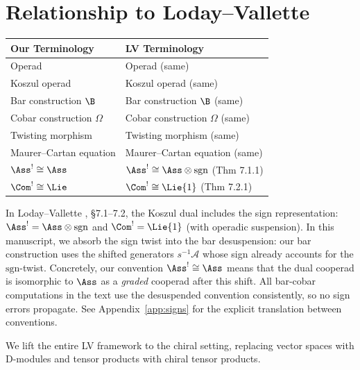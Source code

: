\section{Relationship to Loday--Vallette}

\begin{tabular}{>{\raggedright\arraybackslash}p{}>{\raggedright\arraybackslash}p{}}
\textbf{Our Terminology} & \textbf{LV Terminology} \\
\hline
Operad & Operad (same) \\
Koszul operad & Koszul operad (same) \\
Bar construction $\B$ & Bar construction $\B$ (same) \\
Cobar construction $\Omega$ & Cobar construction $\Omega$ (same) \\
Twisting morphism & Twisting morphism (same) \\
Maurer--Cartan equation & Maurer--Cartan equation (same) \\
$\Ass^! \cong \Ass$ & $\Ass^! \cong \Ass \otimes \mathrm{sgn}$ (Thm 7.1.1) \\
$\Com^! \cong \Lie$ & $\Com^! \cong \Lie\{1\}$ (Thm 7.2.1) \\
\end{tabular}
\begin{remark}
In Loday--Vallette \cite{LV12}, \S7.1--7.2, the Koszul dual includes the sign representation: $\Ass^! = \Ass \otimes \mathrm{sgn}$ and $\Com^! = \Lie\{1\}$ (with operadic suspension). In this manuscript, we absorb the sign twist into the bar desuspension: our bar construction uses the shifted generators $s^{-1}\mathcal{A}$ whose sign already accounts for the $\mathrm{sgn}$-twist. Concretely, our convention $\Ass^! \cong \Ass$ means that the dual cooperad is isomorphic to $\Ass$ as a \emph{graded} cooperad after this shift. All bar-cobar computations in the text use the desuspended convention consistently, so no sign errors propagate. See Appendix~\ref{app:signs} for the explicit translation between conventions.
\end{remark}

\begin{remark}
We lift the entire LV framework to the chiral setting, replacing vector spaces with D-modules and tensor products with chiral tensor products.
\end{remark}

